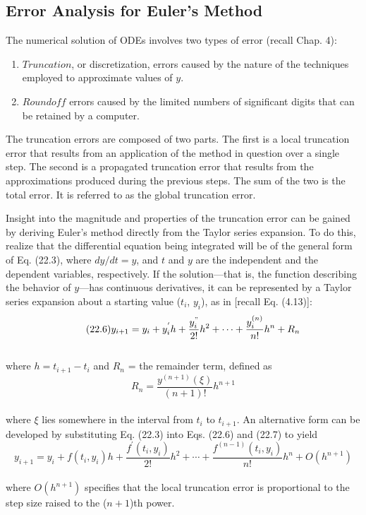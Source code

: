 \documentclass[../main.tex]{subfiles}
\begin{document}
\subsection{Error Analysis for Euler's Method}

The numerical solution of ODEs involves two types of error (recall Chap. 4):
\begin{enumerate}
\item $Truncation$, or discretization, errors caused by the nature of the techniques employed
to approximate values of $y$.
\item $Roundoff$ errors caused by the limited numbers of significant digits that can be retained
by a computer.
\end{enumerate}

The truncation errors are composed of two parts. The first is a local truncation error that results from an application of the method in question over a single step. The second is
a propagated truncation error that results from the approximations produced during the previous steps. The sum of the two is the total error. It is referred to as the global truncation error.

Insight into the magnitude and properties of the truncation error can be gained by deriving Euler's method directly from the Taylor series expansion. To do this, realize that the
differential equation being integrated will be of the general form of Eq. (22.3), where
$dy/dt = y$, and $t$ and $y$ are the independent and the dependent variables, respectively. If
the solution—that is, the function describing the behavior of $y$—has continuous derivatives,
it can be represented by a Taylor series expansion about a starting value ($t_{i}$, $y_{i}$), as in
[recall Eq. (4.13)]:\\
\begin{equation}
\tag{22.6}
y_{i+1} = y_{i} + y^{'}_{i}h + \dfrac{y^{"}_{i}}{2!}h^2 + \cdots + \dfrac{y^{(n)}_{i}}{n!}h^n + R_{n}
\end{equation}\\
where $h = t_{i+1} − t_{i}$ and $R_{n}$ = the remainder term, defined as\\
\begin{equation}
\tag{22.7}
R_{n} = \dfrac{y^{(n+1)}(\xi)}{(n+1)!}h^{n+1}
\end{equation}\\
where $\xi$ lies somewhere in the interval from $t_{i}$ to $t_{i+1}$. An alternative form can be developed by substituting Eq. (22.3) into Eqs. (22.6) and (22.7) to yield\\
\begin{equation}
\tag{22.8}
y_{i+1} = y_{i} + f(t_{i},y_{i})h + \dfrac{f^{'} (t_{i}, y_{i})}{2!}h^2 + \cdots + \dfrac{f^{(n-1)} (t_{i}, y_{i})}{n!}h^n + O(h^{n+1})
\end{equation}\\
where $O(h^{n+1})$ specifies that the local truncation error is proportional to the step size
raised to the ($n + 1$)th power.
\end{document}
